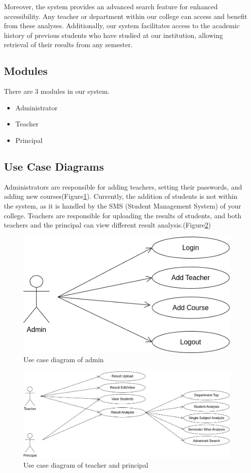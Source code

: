 \documentclass{nascproject}
\begin{document}
Moreover, the system provides an advanced search feature for enhanced accessibility. Any teacher or department within our college can access and benefit from these analyses. Additionally, our system facilitates access to the academic history of previous students who have studied at our institution, allowing retrieval of their results from any semester.
\subsection{Modules}
	There are 3 modules in our system.
  \begin{itemize}
  	\item Administrator
  	\item Teacher
  	\item Principal
  \end{itemize}


\subsection{Use Case Diagrams}
	Administrators are responsible for adding teachers, setting their passwords, and adding new courses(Figure\ref{usecase1}). Currently, the addition of students is not within the system, as it is handled by the SMS (Student Management System) of your college. Teachers are responsible for uploading the results of students, and both teachers and the principal can view different result analysis.(Figure\ref{usecase2})
\begin{figure}
	\centering
	\includegraphics[width=1\linewidth]{usecase2.png}
	\caption{Use case diagram of admin}
	\label{usecase1}
\end{figure}
\begin{figure}
	\centering
	\includegraphics[width=1\linewidth]{usecase1.jpg}
	\caption{Use case diagram of teacher and principal}
	\label{usecase2}
\end{figure}
\end{document}
